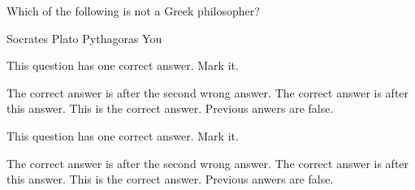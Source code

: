 \documentclass{exam}
\begin{document}
\begin{questions}
\begin{minipage}{\linewidth}
 \checkboxchar{$\Box$}
 \checkedchar{$\blacksquare$}
\end{minipage}


\begin{minipage}{\linewidth}
 \question Which of the following is not a Greek philosopher?

        \begin{oneparcheckboxes}
            \choice Socrates
            \choice Plato
            \choice Pythagoras
            \CorrectChoice You
        \end{oneparcheckboxes}

\end{minipage}


\begin{minipage}{\linewidth}

\question This question has one correct answer. Mark it.

  \begin{checkboxes}
    \choice The correct answer is after the second wrong answer.
    \choice The correct answer is after this answer.
    \choice This is the correct answer.
    \CorrectChoice Previous anwers are false.
   \end{checkboxes}
   \printanswers

\end{minipage}


\begin{minipage}{\linewidth}

   \question This question has one correct answer. Mark it.

   \begin{checkboxes}
     \choice The correct answer is after the second wrong answer.
     \choice The correct answer is after this answer.
     \choice This is the correct answer.
     \CorrectChoice Previous anwers are false.
   \end{checkboxes}
\end{minipage}



 \setcounter{question}{0}



\end{questions}
\end{document}
